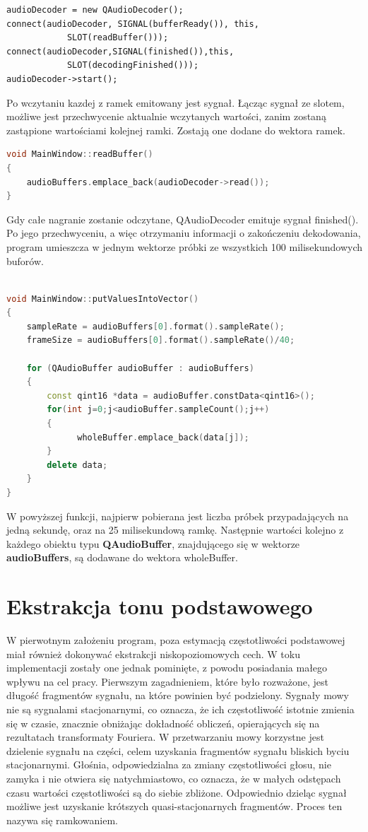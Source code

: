 \documentclass[a4paper,12 pt]{report}
\begin{document}
\begin{lstlisting}
audioDecoder = new QAudioDecoder();
connect(audioDecoder, SIGNAL(bufferReady()), this, 
			SLOT(readBuffer()));
connect(audioDecoder,SIGNAL(finished()),this,
			SLOT(decodingFinished()));
audioDecoder->start();
\end{lstlisting}
Po wczytaniu kazdej z ramek emitowany jest sygnał. Łącząc sygnał ze slotem, możliwe jest przechwycenie aktualnie wczytanych wartości, zanim zostaną zastąpione wartościami kolejnej ramki.
Zostają one dodane do wektora ramek.
\begin{lstlisting}[caption={Funkcja przechwytująca wczytany fragment},label={lst:label},language=C++]
void MainWindow::readBuffer()
{
    audioBuffers.emplace_back(audioDecoder->read());
}
\end{lstlisting}
Gdy całe nagranie zostanie odczytane, QAudioDecoder emituje sygnał finished(). Po jego przechwyceniu, a więc otrzymaniu informacji o zakończeniu dekodowania, program umieszcza w jednym wektorze próbki ze wszystkich 100 milisekundowych buforów.

\begin{lstlisting}[caption={Funkcja dodająca do wektora wszystkie odczytane próbki},label={lst:label},language=C++]

void MainWindow::putValuesIntoVector()
{
    sampleRate = audioBuffers[0].format().sampleRate();
    frameSize = audioBuffers[0].format().sampleRate()/40;
    
    for (QAudioBuffer audioBuffer : audioBuffers)
    {
        const qint16 *data = audioBuffer.constData<qint16>();
        for(int j=0;j<audioBuffer.sampleCount();j++)
        {
              wholeBuffer.emplace_back(data[j]);
        }
        delete data;
    }
}
\end{lstlisting}
W powyższej funkcji, najpierw pobierana jest liczba próbek przypadających na jedną sekundę, oraz na 25 milisekundową ramkę. Następnie wartości kolejno z każdego obiektu typu \textbf{QAudioBuffer}, znajdującego się w wektorze \textbf{audioBuffers}, są dodawane do wektora wholeBuffer.

\section{Ekstrakcja tonu podstawowego}
W pierwotnym założeniu program, poza estymacją częstotliwości podstawowej miał również dokonywać ekstrakcji niskopoziomowych cech.
W toku implementacji zostały one jednak pominięte, z powodu posiadania małego wpływu na cel pracy. 
Pierwszym zagadnieniem, które było rozważone, jest długość fragmentów sygnału, na które powinien być podzielony.
Sygnały mowy nie są sygnalami stacjonarnymi, co oznacza, że ich częstotliwość istotnie zmienia się w czasie, znacznie obniżając dokładność obliczeń, opierających się na rezultatach transformaty Fouriera.
W przetwarzaniu mowy korzystne jest dzielenie sygnału na części, celem uzyskania fragmentów sygnału bliskich byciu stacjonarnymi.
Głośnia, odpowiedzialna za zmiany częstotliwości głosu, nie zamyka i nie otwiera się natychmiastowo, co oznacza, że w małych odstępach czasu wartości częstotliwości są do siebie zbliżone.
Odpowiednio dzieląc sygnał możliwe jest uzyskanie krótszych  quasi-stacjonarnych fragmentów. Proces ten nazywa się ramkowaniem.
\end{document}
